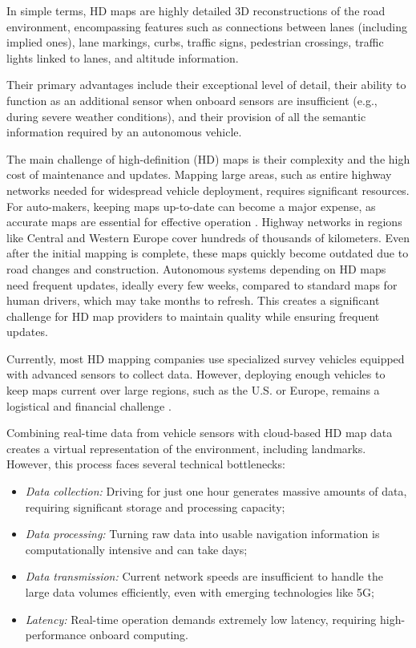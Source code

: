 In simple terms, HD maps are highly detailed 3D reconstructions of the road environment, encompassing features such as connections between lanes (including implied ones), lane markings, curbs, traffic signs, pedestrian crossings, traffic lights linked to lanes, and altitude information. 

Their primary advantages include their exceptional level of detail, their ability to function as an additional sensor when onboard sensors are insufficient (e.g., during severe weather conditions), and their provision of all the semantic information required by an autonomous vehicle.

The main challenge of high-definition (HD) maps is their complexity and the high cost of maintenance and updates. Mapping large areas, such as entire highway networks needed for widespread vehicle deployment, requires significant resources. For auto-makers, keeping maps up-to-date can become a major expense, as accurate maps are essential for effective operation \cite{gitlin2017detailedmaps}. Highway networks in regions like Central and Western Europe cover hundreds of thousands of kilometers. Even after the initial mapping is complete, these maps quickly become outdated due to road changes and construction. Autonomous systems depending on HD maps need frequent updates, ideally every few weeks, compared to standard maps for human drivers, which may take months to refresh. This creates a significant challenge for HD map providers to maintain quality while ensuring frequent updates.

Currently, most HD mapping companies use specialized survey vehicles equipped with advanced sensors to collect data. However, deploying enough vehicles to keep maps current over large regions, such as the U.S. or Europe, remains a logistical and financial challenge \cite{dahlstrom2021hdmaps}.

Combining real-time data from vehicle sensors with cloud-based HD map data creates a virtual representation of the environment, including landmarks. However, this process faces several technical bottlenecks:
\begin{itemize}
    \item \textit{Data collection:} Driving for just one hour generates massive amounts of data, requiring significant storage and processing capacity;
    \item \textit{Data processing:} Turning raw data into usable navigation information is computationally intensive and can take days;
    \item \textit{Data transmission:} Current network speeds are insufficient to handle the large data volumes efficiently, even with emerging technologies like 5G;
    \item \textit{Latency:} Real-time operation demands extremely low latency, requiring high-performance onboard computing.
\end{itemize}

